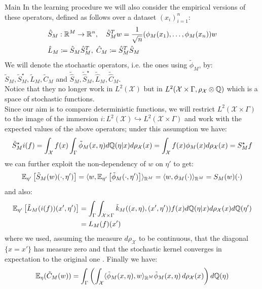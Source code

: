 \begin{chapter}{Main}
 In the learning procedure we will also consider the empirical versions of these operators, defined as follows over a dataset $(x_i)_{i=1}^n$:
 \begin{align*}
      & \hat{S}_M: \mathbb{R}^M \to \mathbb{R}^n, \quad \hat{S}_M^T w = \frac{1}{\sqrt{n}}(\phi_M(x_1), \dots, \phi_M(x_n)) w \\
      & \hat{L}_M \coloneqq \hat{S}_M \hat{S}_M^T, \; \hat{C}_M \coloneqq \hat{S}_M^T \hat{S}_M
 \end{align*}
 We will denote the stochastic operators, i.e. the ones using $\tilde{\phi}_M$, by: $\tilde{S}_M, \tilde{S}^\star_M, \tilde{L}_M, \tilde{C}_M$ and $\tilde{\hat{S}}_M, {\tilde{\hat{S}}}^\star_M, \tilde{\hat{L}}_M, \tilde{\hat{C}}_M$. \\
 Notice that they no longer work in $L^2(\mathcal{X})$ but in $L^2(\mathcal{X}\times \Gamma, \rho_{\mathcal{X}} \otimes \mathbb{Q})$ which is a space of stochastic functions.\\
 Since our aim is to compare deterministic functions, we will restrict $L^2(\mathcal{X}\times \Gamma)$ to the image of the immersion $i: L^2(\mathcal{X}) \hookrightarrow L^2(\mathcal{X}\times \Gamma)$ and work with the expected values of the above operators; under this assumption we have:
 $$\tilde{S}_M^\star i(f) = \int_{\mathcal{X}}f(x)\int_\Gamma \tilde{\phi}_M(x, \eta)d\mathbb{Q}(\eta|x)d\rho_{\mathcal{X}}(x) =\int_{\mathcal{X}}f(x)\phi_M(x)d\rho_{\mathcal{X}}(x) = S_M^\star f $$
 we can further exploit the non-dependency of $w$ on $\eta'$ to get:
 $$
     \mathbb{E}_{\eta'}\left[\tilde{S}_M(w)(\cdot, \eta')\right] = \langle w, \mathbb{E}_{\eta'}\left[\tilde{\phi}_M(\cdot,\eta')\right] \rangle_{\mathbb{R}^M} =\langle w, \phi_M(\cdot) \rangle_{\mathbb{R}^M} = S_M(w)(\cdot)                                                                \\
 $$
 and also:
 \begin{align*}
     \mathbb{E}_{\eta'}\left[\tilde{L}_M(i(f))(x', \eta')\right] & = \int_\Gamma \int_{\mathcal{X}\times \Gamma}\tilde{k}_M((x, \eta), (x', \eta'))f(x) d\mathbb{Q}(\eta|x)d\rho_{\mathcal{X}}(x)d\mathbb{Q}(\eta') \\
                                                         & = L_M(f)(x')
 \end{align*}
 where we used, assuming the measure $d\rho_{\mathcal{X}}$ to be continuous, that the diagonal $\{x = x'\}$ has measure zero and that the stochastic kernel converges in expectation to the original one \cite{zhang2019low}. Finally we have:
 \begin{align*}
     \E_{\eta}(\tilde{C}_M(w)) & = \int_\Gamma \left( \int_{\mathcal{X}} \langle \tilde{\phi}_M(x, \eta), w \rangle_{\R^M} \tilde{\phi}_M(x, \eta) \, d\rho_{\mathcal{X}}(x) \right) d\Q(\eta) \\

\end{align*}
\end{chapter}
